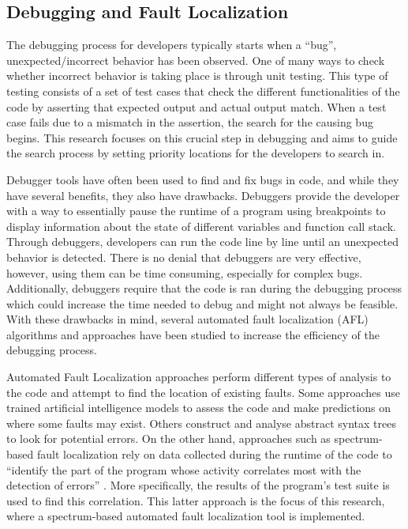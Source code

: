 \subsection{Debugging and Fault Localization}
\label{subsec:DebuggingAndAFL}

The debugging process for developers typically starts when a ``bug'',
unexpected/incorrect behavior has been observed. One of many ways to check
whether incorrect behavior is taking place is through unit testing. This type of
testing consists of a set of test cases that check the different functionalities of the
code by asserting that expected output and actual output match. When a test case
fails due to a mismatch in the assertion, the search for the causing bug begins.
This research focuses on this crucial step in debugging and aims to guide the
search process by setting priority locations for the developers to search in.

Debugger tools have often been used to find and fix bugs in code, and while they
have several benefits, they also have drawbacks. Debuggers provide the developer
with a way to essentially pause the runtime of a program using breakpoints to display
information about the state of different variables and function call stack.
Through debuggers, developers can run the code line by line until an unexpected
behavior is detected. There is no denial that debuggers are very effective,
however, using them can be time consuming, especially for complex bugs.
Additionally, debuggers require that the code is ran during the debugging
process which could increase the time needed to debug and might not always be
feasible. With these drawbacks in mind, several automated fault localization (AFL)
algorithms and approaches have been studied to increase the
efficiency of the debugging process.

Automated Fault Localization approaches perform different types of analysis to
the code and attempt to find the location of existing faults. Some approaches
use trained artificial intelligence models to assess the code and make
predictions on where some faults may exist. Others construct and analyse
abstract syntax trees to look for potential errors. On the other hand,
approaches such as spectrum-based fault localization rely on data collected
during the runtime of the code to ``identify the part of the program whose
activity correlates most with the detection of errors'' \cite{ABREU20091780}.
More specifically, the results of the program's test suite is used to find this
correlation. This latter approach is the focus of this research, where a
spectrum-based automated fault localization tool is implemented.

